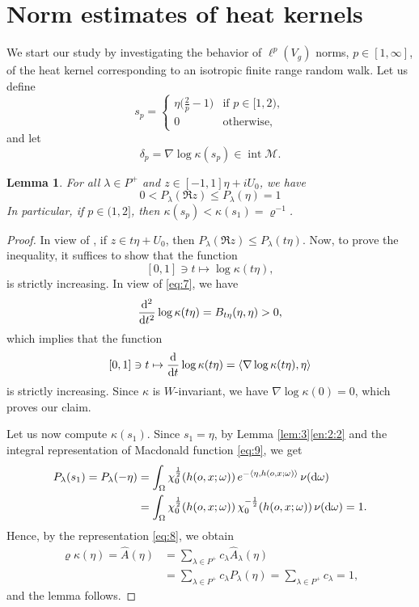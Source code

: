 \documentclass[11pt]{amsart}
\newcommand{\calM}{\mathcal{M}}
\newcommand{\inter}{\operatorname{int}}
\theoremstyle{plain}
\newtheorem{lemma}[theorem]{Lemma}
\theoremstyle{definition}
\numberwithin{equation}{section}
\begin{document}
\section{Norm estimates of heat kernels}
\label{sec:2}
We start our study by investigating the behavior of $\ell^p(V_g)$ norms, $p \in [1, \infty]$, of the heat kernel corresponding
to an isotropic finite range random walk. Let us define
\begin{equation}
	\label{eq:5}
	s_p = 
	\begin{cases}
		\eta \big(\frac{2}{p}-1\big) & \text{if } p \in [1, 2), \\
		0 & \text{otherwise,}
	\end{cases}
\end{equation}
and let
\[
	\delta_p = \nabla \log \kappa(s_p) \in \inter \calM.
\]
\begin{lemma}
	\label{lem:2}
	For all $\lambda \in P^+$ and $z \in [-1, 1]\eta + i U_0$, we have
	\[
		0 < P_\lambda(\Re z) \leqslant P_\lambda(\eta) = 1
	\]
	In particular, if $p \in (1, 2]$, then $\kappa(s_p)<\kappa(s_1)=\varrho^{-1}$.
\end{lemma}
\begin{proof}
	In view of \cite[Theorem 7]{tr}, if $z \in t \eta + U_0$, then $P_\lambda(\Re z) \leqslant P_\lambda(t \eta)$.
	Now, to prove the inequality, it suffices to show that the function
	\[
		[0, 1] \ni t \mapsto \log\kappa(t\eta),
	\]
	is strictly increasing. In view of \eqref{eq:7}, we have
	\[
		\frac{{\rm d} ^2}{{\rm d} t^2}\log \kappa(t\eta) = B_{t\eta}(\eta, \eta) > 0,
	\]
	which implies that the function 
	\[
		[0, 1] \ni t \mapsto \frac{{\rm d}}{{\rm d} t} \log \kappa(t \eta)=\langle \nabla \log \kappa(t\eta),\eta \rangle
	\]
	is strictly increasing. Since $\kappa$ is $W$-invariant, we have $\nabla \log \kappa(0) = 0$, which proves our claim.
	
	Let us now compute $\kappa(s_1)$. Since $s_1 = \eta$, by Lemma \ref{lem:3}\eqref{en:2:2} and the integral representation of
	Macdonald function \eqref{eq:9}, we get
	\begin{align*}
		P_{\lambda}(s_1) = P_{\lambda}(-\eta)
		&=\int_{\Omega}\chi_0^{\frac{1}{2}}(h(o,x;\omega))\, e^{-\langle \eta,h(o,x;\omega) \rangle}\, \nu({\rm d} \omega)  \\
		&=\int_{\Omega}\chi_0^{\frac{1}{2}}(h(o,x;\omega))\, \chi_0^{-\frac{1}{2}}(h(o,x;\omega))\, \nu({\rm d} \omega)=1.
	\end{align*}
	Hence, by the representation \eqref{eq:8}, we obtain
	\begin{align*}
		\varrho \kappa(\eta) = 
		\hat{A} (\eta) &=\sum_{\lambda \in P^{+}} c_{\lambda} \hat{A}_{\lambda} (\eta) \\
		&=\sum_{\lambda \in P^{+}} c_{\lambda} P_{\lambda}(\eta)
		=\sum_{\lambda \in P^{+}} c_{\lambda} = 1,
	\end{align*}
	and the lemma follows.
\end{proof}
\end{document}
